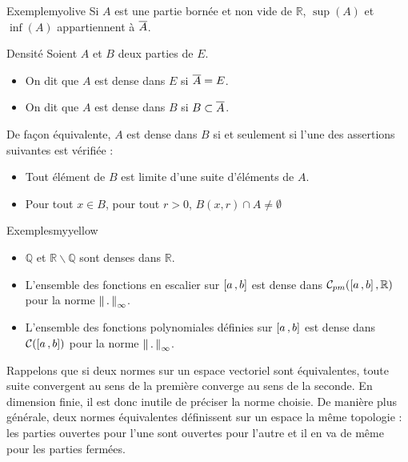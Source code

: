     \begin{omed}{Exemple}{myolive}
        Si $A$ est une partie bornée et non vide de $\mathbb{R}$, $\sup(A)$ et $\inf(A)$ appartiennent à $\overline{A}$.
    \end{omed}

    \begin{defi}{Densité}{}
        Soient $A$ et $B$ deux parties de $E$.
        \begin{itemize}
            \item On dit que $A$ est dense dans $E$ si $\overline{A} = E$.
            \item On dit que $A$ est dense dans $B$ si $B \subset \overline{A}$.
        \end{itemize}
    \end{defi}

    De façon équivalente, $A$ est dense dans $B$ si et seulement si l’une des assertions suivantes est vérifiée : 
    \begin{itemize}
        \item Tout élément de $B$ est limite d’une suite d’éléments de $A$.
        \item Pour tout $x \in B$, pour tout $r > 0$, $B(x,r) \cap A \neq \emptyset$
    \end{itemize}

    \begin{omed}{Exemples}{myyellow}
        \begin{itemize}
            \item $\mathbb{Q}$ et $\mathbb{R} \backslash \mathbb{Q}$ sont denses dans $\mathbb{R}$.
            \item L’ensemble des fonctions en escalier sur $\left[ a \, , b \right]$ est dense dans $\mathcal{C}_{pm}(\left[ a \, , b \right],\mathbb{R})$ pour la norme $\left\lVert\,.\,\right\rVert_{\infty}$.
            \item L’ensemble des fonctions polynomiales définies sur $\left[ a \, , b \right]$ est dense dans $\mathcal{C}(\left[ a \, , b \right])$ pour la norme $\left\lVert\,.\,\right\rVert_{\infty}$.
        \end{itemize}
    \end{omed}

    Rappelons que si deux normes sur un espace vectoriel sont équivalentes, toute suite convergent au sens de la première converge au sens de la seconde. En dimension finie, il est donc inutile de préciser la norme choisie. De manière plus générale, deux normes équivalentes définissent sur un espace la même topologie : les parties ouvertes pour l’une sont ouvertes pour l’autre et il en va de même pour les parties fermées.

